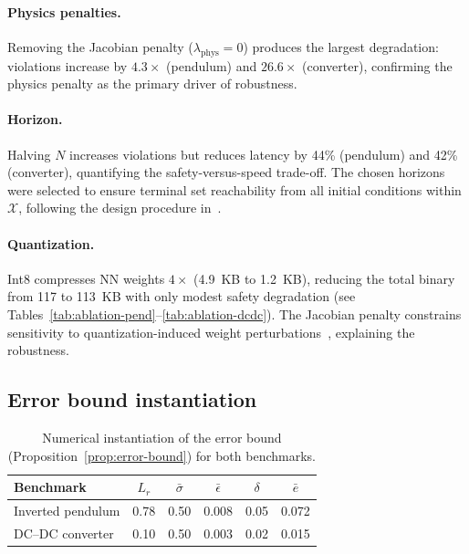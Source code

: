 \documentclass[12pt,a4paper]{article}
\begin{document}
\paragraph{Physics penalties.} Removing the Jacobian penalty
($\lambda_{\mathrm{phys}}=0$) produces the largest degradation:
violations increase by $4.3\times$ (pendulum) and $26.6\times$
(converter), confirming the physics penalty as the primary driver of
robustness.

\paragraph{Horizon.} Halving $N$ increases violations but reduces
latency by 44\% (pendulum) and 42\% (converter), quantifying the
safety-versus-speed trade-off. The chosen horizons were selected to
ensure terminal set reachability from all initial conditions within
$\mathcal{X}$, following the design procedure
in~\cite{mayne2005robust}.

\paragraph{Quantization.} Int8 compresses NN weights $4\times$
(4.9~KB to 1.2~KB), reducing the total binary from 117 to 113~KB with
only modest safety degradation (see
Tables~\ref{tab:ablation-pend}--\ref{tab:ablation-dcdc}). The Jacobian
penalty constrains sensitivity to quantization-induced weight
perturbations~\cite{liang2021pruning}, explaining the robustness.

\subsection{Error bound instantiation}
\label{subsec:error-bound-results}

\begin{table}[t]
  \centering\small
  \caption{Numerical instantiation of the error bound
  (Proposition~\ref{prop:error-bound}) for both benchmarks.}
  \label{tab:error-bound}
  \begin{tabular*}{\textwidth}{@{\extracolsep{\fill}}lccccc}
    \toprule
    Benchmark & $L_r$ & $\bar\sigma$ & $\bar\epsilon$ & $\delta$ & $\bar{e}$ \\
    \midrule
    Inverted pendulum & 0.78 & 0.50 & 0.008 & 0.05 & 0.072 \\
    DC--DC converter  & 0.10 & 0.50 & 0.003 & 0.02 & 0.015 \\
    \bottomrule
  \end{tabular*}
\end{table}
\end{document}
